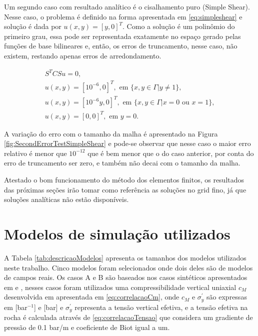     
Um segundo caso com resultado analítico é o cisalhamento puro (Simple Shear). Nesse caso, o problema é definido na forma apresentada em \eqref{eq:simpleshear}  e solução é dada por $u(x,y) = [y, 0]^T$. Como a solução é um polinômio do primeiro grau, essa pode ser representada exatamente no espaço gerado pelas funções de base bilineares e, então, os erros de truncamento, nesse caso, não existem, restando apenas  erros de arredondamento. 

\begin{equation}\label{eq:simpleshear}
    \begin{aligned}
        S^T C S u = 0, \\
        u(x,y) = [10^{-6}, 0]^T, \text{ em } \{x, y \in \Gamma | y \neq 1\} ,\\
        u(x,y) = [10^{-6}y, 0]^T, \text{ em } \{x, y \in \Gamma | x = 0 \text{ ou } x = 1\}, \\
        u(x,y) = [0, 0]^T, \text{ em } y=0.
    \end{aligned}
\end{equation}

A variação do erro com o tamanho da malha é apresentado na Figura \ref{fig:SecondErrorTestSimpleShear} e pode-se observar que nesse caso o maior erro relativo é menor que $10^{-12}$ que é bem menor que o do caso anterior, por conta do erro de truncamento ser zero, e também não decai com o tamanho da malha.

Atestado o bom funcionamento do método dos elementos finitos, os resultados das próximas seções irão tomar como referência as soluções no grid fino, já que soluções analíticas não estão disponíveis.


\section{Modelos de simulação utilizados}

 A Tabela \ref{tab:descricaoModelos} apresenta os tamanhos dos modelos utilizados neste trabalho. Cinco modelos foram selecionados onde dois deles são de modelos de campos reais. Os casos A e B são baseados nos casos sintéticos apresentados em \cite{casteletto} e \cite{irina}, nesses casos foram utilizados uma compressibilidade vertical uniaxial $c_M$ desenvolvida em \cite{correlacaoE} apresentada em \eqref{eq:correlacaoCm}, onde $c_M$ e $\sigma_y^\prime$ são expressas em [bar$^{-1}$] e [bar] e  $\sigma_y^\prime$ representa a tensão vertical efetiva, e a tensão efetiva na rocha é calculada através de  \eqref{eq:correlacaoTensao} que considera um gradiente de pressão de 0.1 bar/m e coeficiente de Biot igual a um.

